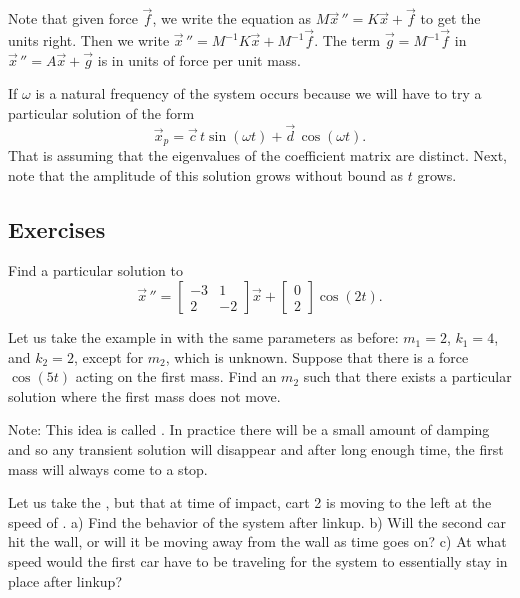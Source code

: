 \documentclass[12pt]{book}
\begin{document}
Note that given force $\vec{f}$, we write 
the equation as $M {\vec{x}\,}'' = K \vec{x} + \vec{f}$ to get the units
right. Then we write
${\vec{x}\,}'' = M^{-1}K \vec{x} + M^{-1}\vec{f}$.  The 
term $\vec{g} = M^{-1} \vec{f}$ in ${\vec{x}\,}'' = A \vec{x} + \vec{g}$ is in units of force
per unit mass.

If $\omega$ is a natural frequency of the system
\emph{} occurs
because we will have to try a particular solution of the form
\begin{equation*}
\vec{x}_p =
\vec{c} \, t \sin (\omega t) +
\vec{d} \, \cos (\omega t) .
\end{equation*}
That is assuming that the eigenvalues of the coefficient matrix are distinct.
Next, note that the amplitude of this solution grows without bound as $t$ grows.

\subsection{Exercises}

\begin{exercise}
Find a particular solution to
\begin{equation*}
{\vec{x}\,}'' =
\begin{bmatrix}
-3 & 1 \\
2 & -2
\end{bmatrix}
\vec{x} 
+ 
\begin{bmatrix}
0 \\ 2
\end{bmatrix}
\cos (2 t) .
\end{equation*}
\end{exercise}

\begin{exercise}[challenging]
Let us take the example in  with
the same parameters as before:
$m_1 = 2$, $k_1 = 4$, and $k_2 = 2$, except for $m_2$, which is unknown.
Suppose that there is a force $\cos (5 t)$ acting on the first mass.
Find an $m_2$ such that there exists a particular solution where the
first mass does not move.

Note: This idea is called \emph{}.
In practice there will be a small amount of
damping and so any transient solution will disappear and after long enough
time, the first mass will always come to a stop.
\end{exercise}

\begin{exercise}
Let us take the , but that at
time of impact, cart 2 is moving to the left at the speed of
.  a)
Find the behavior of the system after linkup.  b) Will the second car hit
the wall, or will it be moving away from the wall as time goes on?  c) At
what speed would the first car have to be traveling for the system to
essentially stay in place after linkup?
\end{exercise}
\end{document}
